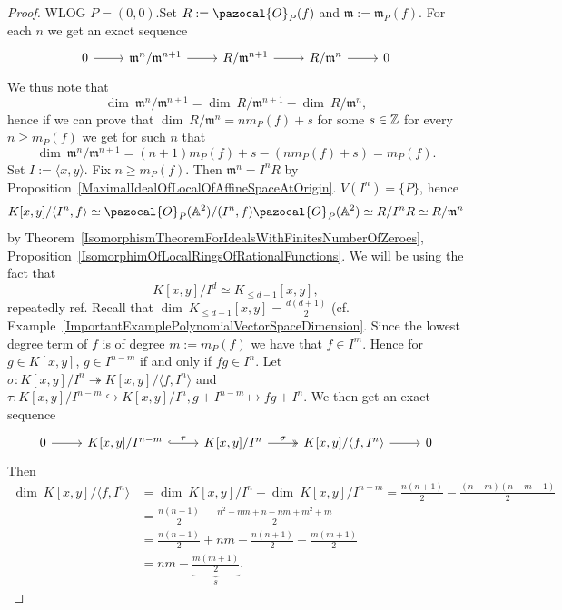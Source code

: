     \begin{proof}
        WLOG $P=(0,0)$.Set $R:=\pazocal{O}_P(f)$ and $\mathfrak{m}:=\mathfrak{m}_P(f)$. For each $n$ we get an exact sequence 
        $$\begin{tikzcd}
            0 \arrow[r] & \mathfrak{m}^{n}/\mathfrak{m}^{n+1} \arrow[r] & R/\mathfrak{m}^{n+1} \arrow[r] &R/\mathfrak{m}^n \arrow[r] &0
        \end{tikzcd}$$
        We thus note that 
        $$\dim\ \mathfrak{m}^{n}/\mathfrak{m}^{n+1} = \dim \ R/\mathfrak{m}^{n+1} - \dim \ R/\mathfrak{m}^n,$$
        hence if we can prove that $\dim \ R/\mathfrak{m}^n = nm_P(f)+s$ for some $s\in \mathbb{Z}$ for every $n\geq m_P(f)$ we get for such $n$ that 
        $$\dim\ \mathfrak{m}^{n}/\mathfrak{m}^{n+1} = (n+1)m_P(f)+s-(nm_P(f)+s)=m_P(f).$$
        Set $I:=\langle x,y\rangle$. Fix $n\geq m_P(f)$. Then $\mathfrak{m}^n = I^nR$ by Proposition~\ref{MaximalIdealOfLocalOfAffineSpaceAtOrigin}. $V(I^n)=\{P\}$, hence 
        $$K[x,y]/\langle I^n, f\rangle \simeq \pazocal{O}_P(\A^2)/(I^n,f)\pazocal{O}_P(\A^2)\simeq R/I^nR\simeq R/\mathfrak{m}^n$$
       by Theorem~\ref{IsomorphismTheoremForIdealsWithFinitesNumberOfZeroes}, Proposition~\ref{IsomorphimOfLocalRingsOfRationalFunctions}. We will be using the fact that 
        $$K[x,y]/I^d \simeq K_{\leq d-1}[x,y],$$
        repeatedly {\large ref}. Recall that $\dim\ K_{\leq d-1}[x,y] = \frac{d(d+1)}{2}$ (cf. Example~\ref{ImportantExamplePolynomialVectorSpaceDimension}.  Since the lowest degree term of $f$ is of degree $m:= m_P(f)$ we have that $f\in I^m$. Hence for $g\in K[x,y]$, $g\in I^{n-m}$ if and only if $fg \in I^n$. Let $\sigma : K[x,y]/I^n \twoheadrightarrow K[x,y]/\langle f,I^n\rangle$ and $\tau: K[x,y]/I^{n-m} \hookrightarrow K[x,y]/I^n, g + I^{n-m}\mapsto fg+I^n$. We then get an exact sequence 
        $$\begin{tikzcd}
            0 \arrow[r] & K[x,y]/I^{n-m} \arrow[r,"\tau", hookrightarrow] & K[x,y]/I^n \arrow[r, "\sigma", twoheadrightarrow] & K[x,y]/\langle f,I^n\rangle \arrow[r] & 0
        \end{tikzcd}$$
        Then 
        \begin{align*} 
            \dim \ K[x,y]/\langle f,I^n\rangle &= \dim \ K[x,y]/I^n-\dim \ K[x,y]/I^{n-m} =  \frac{n(n+1)}{2}-\frac{(n-m)(n-m+1)}{2}\\ 
            &=  \frac{n(n+1)}{2}- \frac{n^2-nm+n-nm+m^2+m}{2}\\ 
            &= \frac{n(n+1)}{2} +nm -\frac{n(n+1)}{2}-\frac{m(m+1)}{2}\\ 
            &= nm - \underbrace{\frac{m(m+1)}{2}}_s.\end{align*}
    \end{proof}
